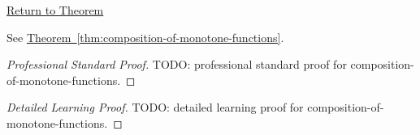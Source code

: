 \newpage
{}
\label{prf:composition-of-monotone-functions}

\begin{remark*}[Return]
\hyperref[thm:composition-of-monotone-functions]{Return to Theorem}
\end{remark*}

\begin{theorem*}
See \hyperref[thm:composition-of-monotone-functions]{Theorem~\ref*{thm:composition-of-monotone-functions}}.
\end{theorem*}

\begin{proof}[Professional Standard Proof]
\LRAProofBodyStart
TODO: professional standard proof for composition-of-monotone-functions.
\end{proof}

\begin{proof}[Detailed Learning Proof]
\LRAProofBodyStart
TODO: detailed learning proof for composition-of-monotone-functions.
\end{proof}

\begin{remark*}
\end{remark*}

\begin{dependencies}
\NoLocalDependencies
\end{dependencies}

\clearpage
